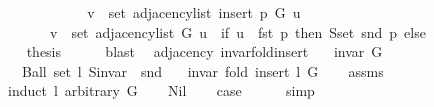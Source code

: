 \begin{isabellebody}
\ \ \ \ \isamarkupfalse%
\ \isamarkupfalse%
\isanewline
\ \ \ \ \ \ {\isachardoublequoteopen}v\ {\isasymin}\ set\ {\isacharparenleft}{\kern0pt}adjacency{\isacharunderscore}{\kern0pt}list\ {\isacharparenleft}{\kern0pt}insert{\isacharunderscore}{\kern0pt}{}\ p\ G{\isacharparenright}{\kern0pt}\ u{\isacharparenright}{\kern0pt}\ {\isasymlongleftrightarrow}\isanewline
\ \ \ \ \ \ \ v\ {\isasymin}\ set\ {\isacharparenleft}{\kern0pt}adjacency{\isacharunderscore}{\kern0pt}list\ G\ u{\isacharparenright}{\kern0pt}\ {\isasymunion}\ {\isacharparenleft}{\kern0pt}if\ u\ {\isacharequal}{\kern0pt}\ fst\ p\ then\ S{\isachardot}{\kern0pt}set\ {\isacharparenleft}{\kern0pt}snd\ p{\isacharparenright}{\kern0pt}\ else\ {\isacharbraceleft}{\kern0pt}{\isacharbraceright}{\kern0pt}{\isacharparenright}{\kern0pt}{\isachardoublequoteclose}\isanewline
\ \ \ \ \ \ \isacommand{{\isachardot}{\kern0pt}}\isamarkupfalse%
\ \isacommand{{\isacharbraceright}{\kern0pt}}\isamarkupfalse%
\isanewline
\ \ \isamarkupfalse%
\ {\isacharquery}{\kern0pt}thesis\isanewline
\ \ \ \ \isamarkupfalse%
\ blast\isanewline
{}\isamarkupfalse%
%
\endisatagproof
{\isafoldproof}%
%
\isadelimproof
\isanewline
%
\endisadelimproof
\isanewline
{}\isamarkupfalse%
\ {\isacharparenleft}{\kern0pt}\ adjacency{\isacharparenright}{\kern0pt}\ invar{\isacharunderscore}{\kern0pt}fold{\isacharunderscore}{\kern0pt}insert{\isacharunderscore}{\kern0pt}{}{\isacharcolon}{\kern0pt}\isanewline
\ \ \ {\isachardoublequoteopen}invar\ G{\isachardoublequoteclose}\isanewline
\ \ \ {\isachardoublequoteopen}Ball\ {\isacharparenleft}{\kern0pt}set\ l{\isacharparenright}{\kern0pt}\ {\isacharparenleft}{\kern0pt}S{\isachardot}{\kern0pt}invar\ {\isasymcirc}\ snd{\isacharparenright}{\kern0pt}{\isachardoublequoteclose}\isanewline
\ \ \ {\isachardoublequoteopen}invar\ {\isacharparenleft}{\kern0pt}fold\ insert{\isacharunderscore}{\kern0pt}{}\ l\ G{\isacharparenright}{\kern0pt}{\isachardoublequoteclose}\isanewline
%
\isadelimproof
\ \ %
\endisadelimproof
%
\isatagproof
{}\isamarkupfalse%
\ assms\isanewline
{}\isamarkupfalse%
\ {\isacharparenleft}{\kern0pt}induct\ l\ arbitrary{\isacharcolon}{\kern0pt}\ G{\isacharparenright}{\kern0pt}\isanewline
\ \ \isamarkupfalse%
\ Nil\isanewline
\ \ \isamarkupfalse%
\ {\isacharquery}{\kern0pt}case\isanewline
\ \ \ \ \isamarkupfalse%
\ simp\isanewline

\end{isabellebody}
